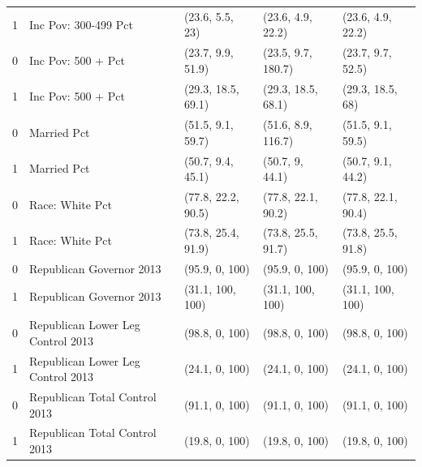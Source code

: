\begin{table}[h!]
\begin{tabular}{rllll}
  1 & Inc Pov: 300-499 Pct & (23.6, 5.5, 23) & (23.6, 4.9, 22.2) & (23.6, 4.9, 22.2) \\ 
  0 & Inc Pov: 500 + Pct & (23.7, 9.9, 51.9) & (23.5, 9.7, 180.7) & (23.7, 9.7, 52.5) \\ 
  1 & Inc Pov: 500 + Pct & (29.3, 18.5, 69.1) & (29.3, 18.5, 68.1) & (29.3, 18.5, 68) \\ 
  0 & Married Pct & (51.5, 9.1, 59.7) & (51.6, 8.9, 116.7) & (51.5, 9.1, 59.5) \\ 
  1 & Married Pct & (50.7, 9.4, 45.1) & (50.7, 9, 44.1) & (50.7, 9.1, 44.2) \\ 
  0 & Race: White Pct & (77.8, 22.2, 90.5) & (77.8, 22.1, 90.2) & (77.8, 22.1, 90.4) \\ 
  1 & Race: White Pct & (73.8, 25.4, 91.9) & (73.8, 25.5, 91.7) & (73.8, 25.5, 91.8) \\ 
  0 & Republican Governor 2013 & (95.9, 0, 100) & (95.9, 0, 100) & (95.9, 0, 100) \\ 
  1 & Republican Governor 2013 & (31.1, 100, 100) & (31.1, 100, 100) & (31.1, 100, 100) \\ 
  0 & Republican Lower Leg Control 2013 & (98.8, 0, 100) & (98.8, 0, 100) & (98.8, 0, 100) \\ 
  1 & Republican Lower Leg Control 2013 & (24.1, 0, 100) & (24.1, 0, 100) & (24.1, 0, 100) \\ 
  0 & Republican Total Control 2013 & (91.1, 0, 100) & (91.1, 0, 100) & (91.1, 0, 100) \\ 
  1 & Republican Total Control 2013 & (19.8, 0, 100) & (19.8, 0, 100) & (19.8, 0, 100) \\ 
   \hline
\end{tabular}
\end{table}

